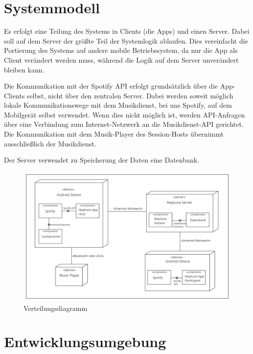 \documentclass[oneside, ngerman]{sdqtechreport}
\begin{document}
\chapter{Systemmodell}
\label{chap:Systemmodell}

Es erfolgt eine Teilung des Systems in Clients (die Apps) und einen Server. Dabei soll auf dem Server der größte Teil der Systemlogik ablaufen. Dies vereinfacht die Portierung des Systems auf andere mobile Betriebssystem, da nur die App als Client verändert werden muss, während die Logik auf dem Server unverändert bleiben kann.

Die Kommunikation mit der Spotify API erfolgt grundsätzlich über die App-Clients selbst, nicht über den zentralen Server. Dabei werden soweit möglich lokale Kommunikationswege mit dem Musikdienst, bei uns Spotify, auf dem Mobilgerät selbst verwendet. Wenn dies nicht möglich ist, werden API-Anfragen über eine Verbindung zum Internet-Netzwerk an die Musikdienst-API gerichtet. Die Kommunikation mit dem Musik-Player des Session-Hosts übernimmt ausschließlich der Musikdienst.

Der Server verwendet zu Speicherung der Daten eine Datenbank.

\vspace{1cm}

\begin{figure}[h]
    \includegraphics[width = 16cm]{LATEX/Pflichtenheft/GraphicDesigns/Verteilungsdiagramm.png}
    \caption{Verteilungsdiagramm}
    \label{fig:Verteilungsdiagramm}
\end{figure}



\chapter{Entwicklungsumgebung}
\label{chap:Entwicklungsumgebung}
\end{document}
